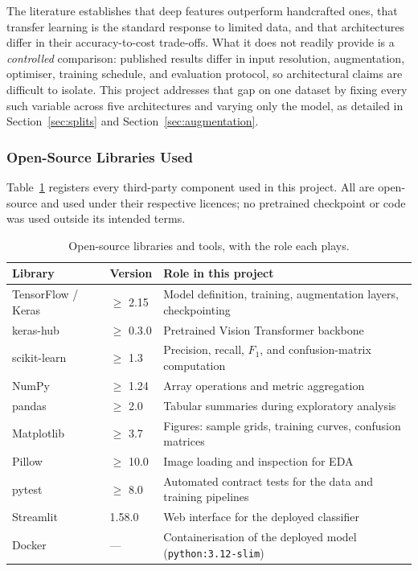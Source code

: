 \documentclass[11pt,twoside,a4paper]{article}
\begin{document}
The literature establishes that deep features outperform handcrafted ones, that
transfer learning is the standard response to limited data, and that
architectures differ in their accuracy-to-cost trade-offs. What it does not
readily provide is a \emph{controlled} comparison: published results differ in
input resolution, augmentation, optimiser, training schedule, and evaluation
protocol, so architectural claims are difficult to isolate. This project
addresses that gap on one dataset by fixing every such variable across five
architectures and varying only the model, as detailed in
Section~\ref{sec:splits} and Section~\ref{sec:augmentation}.

\subsubsection{Open-Source Libraries Used}

Table~\ref{tab:libraries} registers every third-party component used in this
project. All are open-source and used under their respective licences; no
pretrained checkpoint or code was used outside its intended terms.

\begin{table}[H]
\centering
\caption{Open-source libraries and tools, with the role each plays.}
\label{tab:libraries}
\small
\begin{tabular}{lll}
\toprule
Library & Version & Role in this project \\
\midrule
TensorFlow / Keras & $\geq$ 2.15 & Model definition, training, augmentation layers, checkpointing \\
keras-hub & $\geq$ 0.3.0 & Pretrained Vision Transformer backbone \\
scikit-learn & $\geq$ 1.3 & Precision, recall, $F_1$, and confusion-matrix computation \\
NumPy & $\geq$ 1.24 & Array operations and metric aggregation \\
pandas & $\geq$ 2.0 & Tabular summaries during exploratory analysis \\
Matplotlib & $\geq$ 3.7 & Figures: sample grids, training curves, confusion matrices \\
Pillow & $\geq$ 10.0 & Image loading and inspection for EDA \\
pytest & $\geq$ 8.0 & Automated contract tests for the data and training pipelines \\
Streamlit & 1.58.0 & Web interface for the deployed classifier \\
Docker & --- & Containerisation of the deployed model (\texttt{python:3.12-slim}) \\
\bottomrule
\end{tabular}
\end{table}
\end{document}
